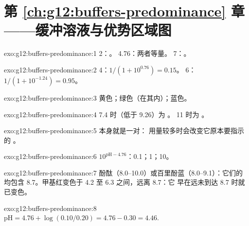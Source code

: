 \section*{第 \ref{ch:g12:buffers-predominance} 章——缓冲溶液与优势区域图}

\begin{solution}{exo:g12:buffers-predominance:1}
 2：。 4.76：两者等量。 7：。
\end{solution}

\begin{solution}{exo:g12:buffers-predominance:2}
 4：$1/(1 + 10^{0.76}) = 0.15$。 6：$1/(1 + 10^{-1.24}) = 0.95$。
\end{solution}

\begin{solution}{exo:g12:buffers-predominance:3}
黄色；绿色（在其内）；蓝色。
\end{solution}

\begin{solution}{exo:g12:buffers-predominance:4}
 7.4 时（低于 9.26）为 。 11 时为 。
\end{solution}

\begin{solution}{exo:g12:buffers-predominance:5}
本身就是一对：
用量较多时会改变它原本要指示的 。
\end{solution}

\begin{solution}{exo:g12:buffers-predominance:6}
$10^{\mathrm{pH} - 4.76}$：0.1；1；10。
\end{solution}

\begin{solution}{exo:g12:buffers-predominance:7}
酚酞（8.0--10.0）或百里酚蓝（8.0--9.1）：它们的
均包含 8.7。甲基红变色于 4.2 至 6.3 之间，远离 8.7：它
早在远未到达 8.7 时就已变色。
\end{solution}

\begin{solution}{exo:g12:buffers-predominance:8}
$\mathrm{pH} = 4.76 + \log(0.10/0.20) = 4.76 - 0.30 = 4.46$.
\end{solution}

